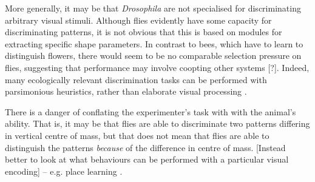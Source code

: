 More generally, it may be that \emph{Drosophila} are not specialised for discriminating arbitrary visual stimuli.
Although flies evidently have some capacity for discriminating patterns, it is not obvious that this is based on modules for extracting specific shape parameters.
In contrast to bees, which have to learn to distinguish flowers, there would seem to be no comparable selection pressure on flies, suggesting that performance may involve coopting other systems [?].
Indeed, many ecologically relevant discrimination tasks can be performed with parsimonious heuristics, rather than elaborate visual processing \cite{Layne1997}.

There is a danger of conflating the experimenter's task with with the animal's ability.
That is, it may be that flies are able to discriminate two patterns differing in vertical centre of mass, but that does not mean that flies are able to distinguish the patterns \emph{because} of the difference in centre of mass.
[Instead better to look at what behaviours can be performed with a particular visual encoding] -- e.g. place learning \cite{Dewar2015}.

\begin{comment}
Unlike for bees, pattern recognition does not seem likely to be an ecologically important behaviour in flies. However, behavioural experiments show some [something] ability (3). \\
	(1) might be by-product of other behaviours \\
	(2) danger of interpreting discrimination as meaning flies...

Can we cite Biosystems in here?
\end{comment}

